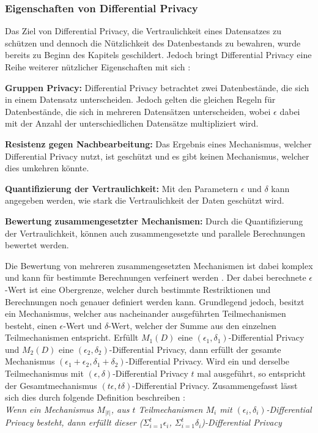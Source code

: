 \subsubsection*{Eigenschaften von Differential Privacy}
Das Ziel von Differential Privacy, die Vertraulichkeit eines Datensatzes zu schützen und dennoch die Nützlichkeit des Datenbestands zu bewahren, wurde bereits zu Beginn des Kapitels geschildert.
Jedoch bringt Differential Privacy eine Reihe weiterer nützlicher Eigenschaften mit sich \cite{P-27}:
\begin{compactitem}
    \item \textbf{Gruppen Privacy:} Differential Privacy betrachtet zwei Datenbestände, die sich in einem Datensatz unterscheiden. Jedoch gelten die gleichen Regeln für Datenbestände, die sich in mehreren Datensätzen unterscheiden, wobei $\epsilon$ dabei mit der Anzahl der unterschiedlichen Datensätze multipliziert wird.
    \item \textbf{Resistenz gegen Nachbearbeitung:} Das Ergebnis eines Mechanismus, welcher Differential Privacy nutzt, ist geschützt und es gibt keinen Mechanismus, welcher dies umkehren könnte.
    \item \textbf{Quantifizierung der Vertraulichkeit:} Mit den Parametern $\epsilon$ und $\delta$ kann angegeben werden, wie stark die Vertraulichkeit der Daten geschützt wird.
    \item \textbf{Bewertung zusammengesetzter Mechanismen:} Durch die Quantifizierung der Vertraulichkeit, können auch zusammengesetzte und parallele Berechnungen bewertet werden.
\end{compactitem}



Die Bewertung von mehreren zusammengesetzten Mechanismen ist dabei komplex und kann für bestimmte Berechnungen verfeinert werden \cite{P-27}. 
Der dabei berechnete $\epsilon$-Wert ist eine Obergrenze, welcher durch bestimmte Restriktionen und Berechnungen noch genauer definiert werden kann.
Grundlegend jedoch, besitzt ein Mechanismus, welcher aus nacheinander ausgeführten Teilmechanismen besteht, einen $\epsilon$-Wert und $\delta$-Wert, welcher der Summe aus den einzelnen Teilmechanismen entspricht.
Erfüllt $M_1(D)$ eine $(\epsilon_1,\delta_1)$-Differential Privacy und $M_2(D)$ eine $(\epsilon_2,\delta_2)$-Differential Privacy, dann erfüllt der gesamte Mechanismus $(\epsilon_1 + \epsilon_2,\delta_1 + \delta_2)$-Differential Privacy.
Wird ein und derselbe Teilmechanismus mit $(\epsilon,\delta)$-Differential Privacy $t$ mal ausgeführt, so entspricht der Gesamtmechanismus $(t\epsilon,t\delta)$-Differential Privacy.
Zusammengefasst lässt sich dies durch folgende Definition beschreiben \cite{P-27}:\\
\textit{
    Wenn ein Mechanismus $M_{|t|}$, aus $t$ Teilmechanismen $M_i$ mit $(\epsilon_i,\delta_i)$-Differential Privacy besteht, dann erfüllt dieser  ($\Sigma_{i=1}^{t} \epsilon_i $, $\Sigma_{i=1}^{t} \delta_i $)-Differential Privacy
}

